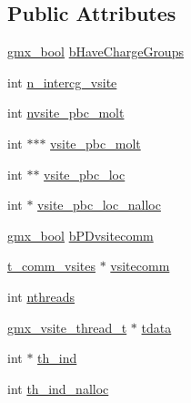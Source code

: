\subsection*{\-Public \-Attributes}
\begin{DoxyCompactItemize}
\item 
\hyperlink{include_2types_2simple_8h_a8fddad319f226e856400d190198d5151}{gmx\-\_\-bool} \hyperlink{structgmx__vsite__t_afe56ebb89ac99332756af5f8bc779948}{b\-Have\-Charge\-Groups}
\item 
int \hyperlink{structgmx__vsite__t_a4893f4ab39091b8902d2296a1c0fbe6f}{n\-\_\-intercg\-\_\-vsite}
\item 
int \hyperlink{structgmx__vsite__t_a82fc64dfa6bbc9fe4e8bb6bb9d9d5525}{nvsite\-\_\-pbc\-\_\-molt}
\item 
int $\ast$$\ast$$\ast$ \hyperlink{structgmx__vsite__t_a5b697ae06c17d7e63e0c1d2c63c057dc}{vsite\-\_\-pbc\-\_\-molt}
\item 
int $\ast$$\ast$ \hyperlink{structgmx__vsite__t_ae523849b8394755b822bd5b2853accd3}{vsite\-\_\-pbc\-\_\-loc}
\item 
int $\ast$ \hyperlink{structgmx__vsite__t_a1492be75f3b0dfcfd8e3fa78368604eb}{vsite\-\_\-pbc\-\_\-loc\-\_\-nalloc}
\item 
\hyperlink{include_2types_2simple_8h_a8fddad319f226e856400d190198d5151}{gmx\-\_\-bool} \hyperlink{structgmx__vsite__t_a2e02b12b86e6f77c80d3730ef08233dd}{b\-P\-Dvsitecomm}
\item 
\hyperlink{structt__comm__vsites}{t\-\_\-comm\-\_\-vsites} $\ast$ \hyperlink{structgmx__vsite__t_a852ccf2c4fe1779d69ba59377dc33550}{vsitecomm}
\item 
int \hyperlink{structgmx__vsite__t_af9d0a70037bed390821b2235797e93a4}{nthreads}
\item 
\hyperlink{structgmx__vsite__thread__t}{gmx\-\_\-vsite\-\_\-thread\-\_\-t} $\ast$ \hyperlink{structgmx__vsite__t_abba3b8904996c3cc9b3f790397eef119}{tdata}
\item 
int $\ast$ \hyperlink{structgmx__vsite__t_af35db0d2f308a1c405ff8546f177f921}{th\-\_\-ind}
\item 
int \hyperlink{structgmx__vsite__t_a9365d7eefc736516070ff57da8c1098a}{th\-\_\-ind\-\_\-nalloc}
\end{DoxyCompactItemize}


